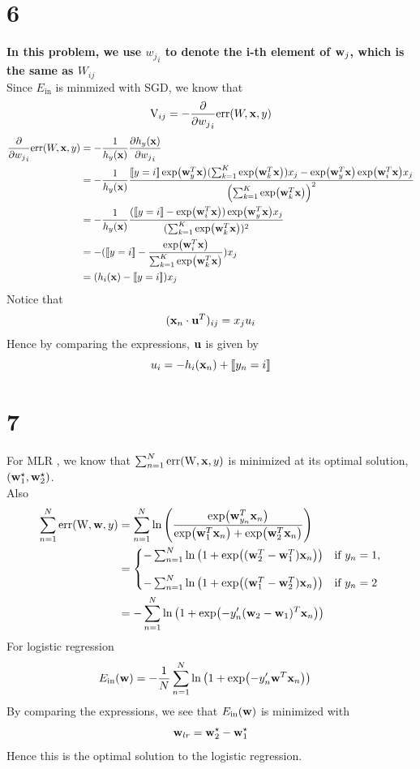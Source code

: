 \documentclass[11pt]{article}
\theoremstyle{definition}
\begin{document}
\section*{6}
\textbf{In this problem, we use ${w_j}_i$ to denote the i-th element of $\vb{w}_j$, which is the same as $W_{ij}$}\\
Since $E_{\text{in}}$ is minmized with SGD, we know that
\[
  \text{V}_{ij} = -\pdv{}{{w_j}_i}\text{err}(W, \vb{x}, y)
\]
\begin{align*}
  \pdv{}{{w_j}_i}\text{err}(W, \vb{x}, y) &= -\frac{1}{h_y(\vb{x})}\pdv{h_y(\vb{x})}{{w_j}_i} \\ 
  &= -\frac{1}{h_y(\vb{x})}\frac{\llbracket y = i\rrbracket\exp(\vb{w}_y^T\vb{x})(\sum^K_{k = 1}\exp(\vb{w}_k^T\vb{x}))x_j- \exp(\vb{w}_y^T\vb{x})\exp(\vb{w}_i^T\vb{x})x_j}{\left(\sum^K_{k = 1}\exp(\vb{w}_k^T\vb{x})\right)^2 } \\ 
  &= -\frac{1}{h_y(\vb{x})}\frac{(\llbracket y = i\rrbracket - \exp(\vb{w}_i^T\vb{x}))\exp(\vb{w}_y^T\vb{x})x_j}{(\sum^K_{k = 1}\exp(\vb{w}_k^T\vb{x}))^2} \\ 
  &= -(\llbracket y = i\rrbracket - \frac{\exp(\vb{w}_i^T\vb{x})}{\sum^K_{k = 1}\exp(\vb{w}_k^T\vb{x})})x_j \\ 
  &= (h_i(\vb{x}) - \llbracket y = i\rrbracket)x_j
\end{align*}
Notice that 
\[
  (\vb{x}_n\cdot\vb{u}^T)_{ij} = x_ju_i
\]
Hence by comparing the expressions, $\vb{u}$ is given by
\[
  u_i = -h_i(\vb{x}_n) + \llbracket y_n = i\rrbracket
\]
\newpage 
\section*{7}
For MLR , we know that $\sum^N_{n = 1}\text{err}(\text{W}, \vb{x}, y)$ is minimized at its optimal solution, $(\vb{w}_1^\star, \vb{w}_2^\star)$. \\ 
Also
\begin{align*}
  \sum^N_{n = 1} \text{err}(\text{W}, \vb{w}, y) &= \sum^N_{n = 1} \ln\left(\frac{\exp(\vb{w}_{y_n}^T \vb{x}_n)}{\exp(\vb{w}_1^T \vb{x}_n) + \exp(\vb{w}_2^T \vb{x}_n)}\right) \\ 
  &= 
  \begin{cases}
    - \sum^N_{n = 1} \ln\left(1 + \exp((\vb{w}_2^T - \vb{w}_1^T) \vb{x}_n)\right) & \text{if } y_n = 1, \\[10pt]
    - \sum^N_{n = 1} \ln\left(1 + \exp((\vb{w}_1^T - \vb{w}_2^T) \vb{x}_n)\right) & \text{if } y_n = 2
  \end{cases} \\ 
  &= -\sum^N_{n = 1}\ln\left(1 +\exp(-y^\prime_n(\vb{w}_2 - \vb{w}_1)^T\vb{x}_n)\right)
\end{align*} 
For logistic regression
\begin{align*}
  E_{\text{in}}(\vb{w}) &= -\frac{1}{N}\sum^N_{n = 1}\ln\left(1 +\exp(-y^\prime_n\vb{w}^T\vb{x}_n)\right)
\end{align*}
By comparing the expressions, we see that $E_{\text{in}}(\vb{w})$ is minimized with
\[
  \vb{w}_{lr} = \vb{w}_2^\star - \vb{w}_1^\star
\]
Hence this is the optimal solution to the logistic regression.
\newpage
\end{document}
